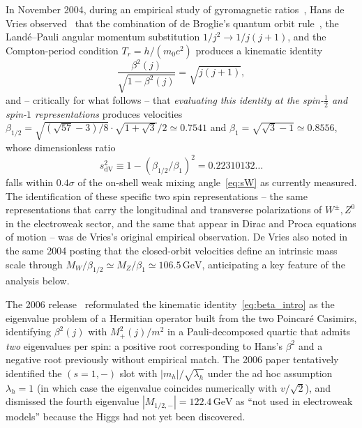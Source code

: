 \documentclass[twocolumn,aps,prd,floatfix,nofootinbib,superscriptaddress,10pt]{article}
\newcommand{\MW}{M_W}
\newcommand{\MZ}{M_Z}
\newcommand{\sdV}{s^2_{\mathrm{dV}}}
\newcommand{\GeV}{\,\mathrm{GeV}}
\begin{document}
In November 2004, during an empirical study of gyromagnetic ratios~\cite{deVriesRivero2005}, Hans de Vries observed~\cite{deVries2004} that the combination of de Broglie's quantum orbit rule~\cite{deBroglie1923}, the Land\'e--Pauli angular momentum substitution $1/j^2 \to 1/j(j+1)$, and the Compton-period condition $T_r=h/(m_0c^2)$ produces a kinematic identity
\begin{equation}
\frac{\beta^2(j)}{\sqrt{1-\beta^2(j)}} = \sqrt{j(j+1)},
\label{eq:beta_intro}
\end{equation}
and -- critically for what follows -- that {\em evaluating this identity at the spin-$\tfrac12$ and spin-$1$ representations} produces velocities $\beta_{1/2}=\sqrt{(\sqrt{57}-3)/8}\cdot\sqrt{1+\sqrt{3}}/2 \simeq 0.7541$ and $\beta_1 = \sqrt{\sqrt{3}-1}\simeq 0.8556$, whose dimensionless ratio
\begin{equation}
\sdV \equiv 1 - (\beta_{1/2}/\beta_1)^2 = 0.22310132\ldots
\label{eq:sdV_intro}
\end{equation}
falls within $0.4\sigma$ of the on-shell weak mixing angle~\eqref{eq:sW} as currently measured. The identification of these specific two spin representations -- the same representations that carry the longitudinal and transverse polarizations of $W^\pm,Z^0$ in the electroweak sector, and the same that appear in Dirac and Proca equations of motion -- was de Vries's original empirical observation. De Vries also noted in the same 2004 posting that the closed-orbit velocities define an intrinsic mass scale through $\MW/\beta_{1/2}\simeq\MZ/\beta_1\simeq 106.5\GeV$, anticipating a key feature of the analysis below.

The 2006 release~\cite{Rivero2006} reformulated the kinematic identity~\eqref{eq:beta_intro} as the eigenvalue problem of a Hermitian operator built from the two Poincar\'e Casimirs, identifying $\beta^2(j)$ with $M^2_+(j)/m^2$ in a Pauli-decomposed quartic that admits {\em two} eigenvalues per spin: a positive root corresponding to Hans's $\beta^2$ and a negative root previously without empirical match. The 2006 paper tentatively identified the $(s=1,-)$ slot with $|m_h|/\sqrt{\lambda_h}$ under the ad hoc assumption $\lambda_h=1$ (in which case the eigenvalue coincides numerically with $v/\sqrt{2}$), and dismissed the fourth eigenvalue $|M_{1/2,-}|=122.4\GeV$ as ``not used in electroweak models'' because the Higgs had not yet been discovered.
\end{document}
